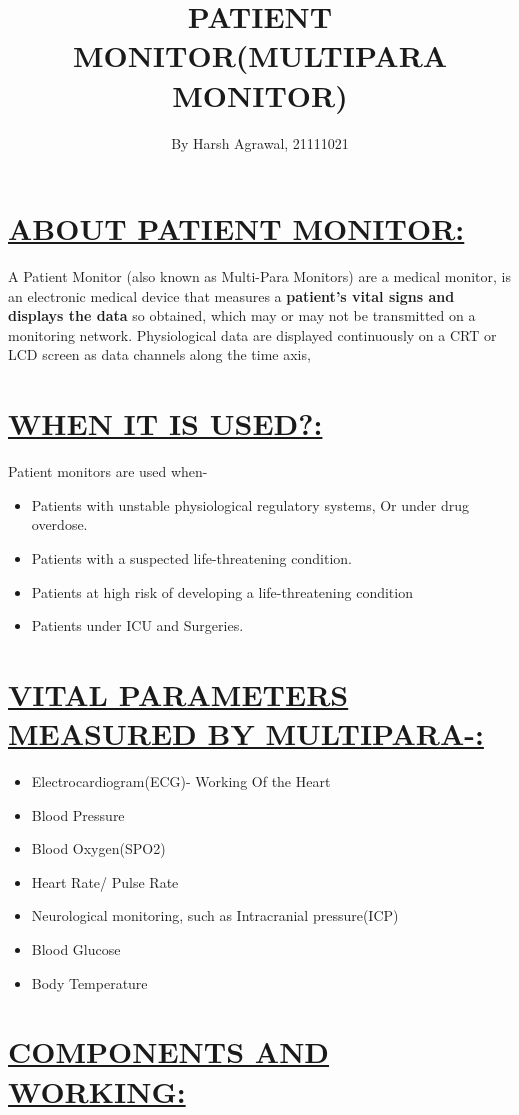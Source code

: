 \documentclass[12pt, monotype corsiva]{article}
\title{\textbf{PATIENT MONITOR(MULTIPARA MONITOR)}}
\author{By Harsh Agrawal, 21111021}
\date{}
\begin{document}
\maketitle
{}

\raggedright{\section{\underline{ABOUT PATIENT MONITOR:}}}
A Patient Monitor (also known as Multi-Para Monitors) are a medical monitor, is an electronic medical device that measures a \textbf{patient's vital signs and displays the data} so obtained, which may or may not be transmitted on a monitoring network. Physiological data are displayed continuously on a CRT or LCD screen as data channels along the time axis, 
\section{\underline{WHEN IT IS USED?:}}
Patient monitors are used when-
\begin{itemize}
\item Patients with unstable physiological regulatory systems, Or under drug overdose.
\item Patients with a suspected life-threatening condition.
\item Patients at high risk of developing a life-threatening condition
\item Patients under ICU and Surgeries.
\end{itemize}
\section{\underline{VITAL PARAMETERS MEASURED BY MULTIPARA-:}}
\begin{itemize}
\item Electrocardiogram(ECG)- Working Of the Heart
\item Blood Pressure	
\item Blood Oxygen(SPO2)
\item Heart Rate/ Pulse Rate
\item Neurological monitoring, such as Intracranial pressure(ICP)
\item Blood Glucose
\item Body Temperature
\end{itemize}
\section{\underline{COMPONENTS AND WORKING:}}
\end{document}
